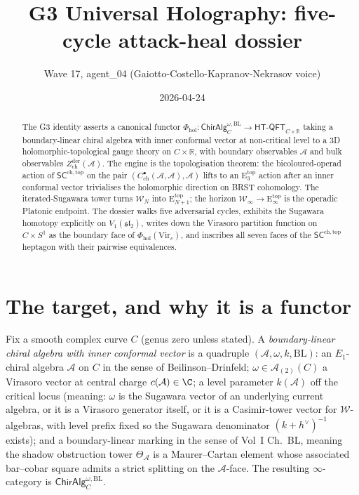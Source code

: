 \documentclass{article}
\theoremstyle{definition}
\theoremstyle{remark}
\newcommand{\SCchtop}{\mathsf{SC}^{\mathrm{ch,top}}}
\newcommand{\Phihol}{\Phi_{\mathrm{hol}}}
\newcommand{\HTQFT}{\mathsf{HT\text{-}QFT}}
\newcommand{\ChirAlg}{\mathsf{ChirAlg}}
\newcommand{\Zder}{Z^{\mathrm{der}}_{\mathrm{ch}}}
\newcommand{\ChirHoch}{C^{\bullet}_{\mathrm{ch}}}
\newcommand{\Etop}[1]{\mathrm{E}_{#1}^{\mathrm{top}}}
\newcommand{\fsl}{\mathfrak{sl}}
\newcommand{\Vir}{\mathrm{Vir}}
\newcommand{\cW}{\mathcal{W}}
\newcommand{\cA}{\mathcal{A}}
\newcommand{\hv}{h^{\vee}}
\begin{document}
\title{G3 Universal Holography: five-cycle attack-heal dossier}
\author{Wave 17, agent\_04 (Gaiotto-Costello-Kapranov-Nekrasov voice)}
\date{2026-04-24}
\maketitle

\begin{abstract}
The G3 identity asserts a canonical functor
$\Phihol\colon \ChirAlg^{\omega,\mathrm{BL}}_{C}
\to \HTQFT_{C\times\mathbb{R}}$
taking a boundary-linear chiral algebra with inner conformal vector
at non-critical level to a 3D holomorphic-topological gauge theory on
$C\times\mathbb{R}$, with boundary observables $\cA$ and bulk
observables $\Zder(\cA)$. The engine is the topologisation theorem:
the bicoloured-operad action of $\SCchtop$ on the pair
$(\ChirHoch(\cA,\cA),\cA)$ lifts to an $\Etop{3}$ action after an
inner conformal vector trivialises the holomorphic direction on
BRST cohomology. The iterated-Sugawara tower turns $\cW_N$ into
$\Etop{N+1}$; the horizon $\cW_\infty \to \Etop{\infty}$ is the
operadic Platonic endpoint. The dossier walks five adversarial
cycles, exhibits the Sugawara homotopy explicitly on $V_1(\fsl_2)$,
writes down the Virasoro partition function on $C\times S^1$ as the
boundary face of $\Phihol(\Vir_c)$, and inscribes all seven faces
of the $\SCchtop$ heptagon with their pairwise equivalences.
\end{abstract}

\tableofcontents

\section{The target, and why it is a functor}
\label{sec:target}

Fix a smooth complex curve $C$ (genus zero unless stated). A
\emph{boundary-linear chiral algebra with inner conformal vector}
is a quadruple $(\cA, \omega, k, \mathrm{BL})$: an $E_1$-chiral
algebra $\cA$ on $C$ in the sense of Beilinson--Drinfeld;
$\omega \in \cA_{(2)}(C)$ a Virasoro vector at central charge
$c(\cA) \in \C$; a level parameter $k(\cA)$ off the critical locus
(meaning: $\omega$ is the Sugawara vector of an underlying current
algebra, or it is a Virasoro generator itself, or it is a
Casimir-tower vector for $\cW$-algebras, with level prefix fixed
so the Sugawara denominator $(k+\hv)^{-1}$ exists); and a
boundary-linear marking in the sense of Vol~I Ch.~BL, meaning the
shadow obstruction tower $\Theta_\cA$ is a Maurer--Cartan element
whose associated bar--cobar square admits a strict splitting on the
$\cA$-face. The resulting $\infty$-category is
$\ChirAlg^{\omega,\mathrm{BL}}_C$.
\end{document}
